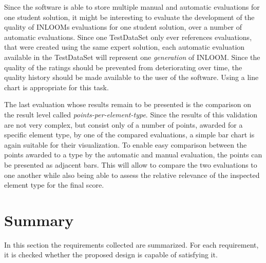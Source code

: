 Since the software is able to store multiple manual and automatic evaluations for one 
student solution, it might be interesting to evaluate the development of the quality of 
INLOOMs evaluations for one student solution, over a number of automatic evaluations. 
Since one TestDataSet only ever references evaluations, that were created using the 
same expert solution, each automatic evaluation available in the TestDataSet will represent
one \textit{generation} of INLOOM. Since the quality of the ratings should be prevented 
from deteriorating over time, the quality history should be made available to the user 
of the software. Using a line chart is appropriate for this task.

The last evaluation whose results remain to be presented is the comparison on the result
level called \textit{points-per-element-type}. Since the results of this validation are
not very complex, but consist only of a number of points, awarded for a specific
element type, by one of the compared evaluations, a simple bar chart is again suitable 
for their visualization. To enable easy comparison between the points awarded to a type
by the automatic and manual evaluation, the points can be presented as adjacent bars. 
This will allow to compare the two evaluations to one another while also being able to
assess the relative relevance of the inspected element type for the final score.



\section{Summary}
In this section the requirements collected are summarized. For each requirement, it is checked
whether the proposed design is capable of satisfying it. 

